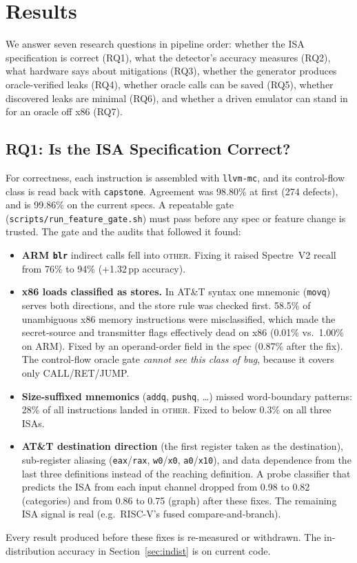 \documentclass[conference]{IEEEtran}
\begin{document}

\section{Results}
\label{sec:results}

We answer seven research questions in pipeline order: whether the ISA
specification is correct (RQ1), what the detector's accuracy measures (RQ2),
what hardware says about mitigations (RQ3), whether the generator produces
oracle-verified leaks (RQ4), whether oracle calls can be saved (RQ5), whether
discovered leaks are minimal (RQ6), and whether a driven emulator can stand in
for an oracle off x86 (RQ7).

\subsection{RQ1: Is the ISA Specification Correct?}
\label{sec:spec-bugs}
For correctness, each instruction is assembled with \texttt{llvm-mc}, and its
control-flow class is read back with \texttt{capstone}. Agreement was 98.80\%
at first (274 defects), and is 99.86\% on the current specs. A repeatable gate
(\texttt{scripts/run\_feature\_gate.sh}) must pass before any spec or feature
change is trusted. The gate and the audits that followed it found:
\begin{itemize}[itemsep=1pt,leftmargin=1.2em]
  \item \textbf{ARM \texttt{blr}} indirect calls fell into \textsc{other}.
    Fixing it raised Spectre~V2 recall from 76\% to 94\% (+1.32\,pp accuracy).
  \item \textbf{x86 loads classified as stores.} In AT\&T syntax one mnemonic
    (\texttt{movq}) serves both directions, and the store rule was checked
    first. 58.5\% of unambiguous x86 memory instructions were misclassified,
    which made the secret-source and transmitter flags effectively dead on x86
    (0.01\% vs.\ 1.00\% on ARM). Fixed by an operand-order field in the spec
    (0.87\% after the fix). The control-flow oracle gate \emph{cannot see this
    class of bug}, because it covers only CALL/RET/JUMP.
  \item \textbf{Size-suffixed mnemonics} (\texttt{addq}, \texttt{pushq},
    \ldots) missed word-boundary patterns: 28\% of all instructions landed in
    \textsc{other}. Fixed to below 0.3\% on all three ISAs.
  \item \textbf{AT\&T destination direction} (the first register taken as the
    destination), sub-register aliasing (\texttt{eax}/\texttt{rax},
    \texttt{w0}/\texttt{x0}, \texttt{a0}/\texttt{x10}), and data dependence
    from the last three definitions instead of the reaching definition.
    A probe classifier that predicts the ISA from each input channel dropped
    from 0.98 to 0.82 (categories) and from 0.86 to 0.75 (graph) after these
    fixes. The remaining ISA signal is real (e.g.\ RISC-V's fused
    compare-and-branch).
\end{itemize}
Every result produced before these fixes is re-measured or withdrawn. The
in-distribution accuracy in Section~\ref{sec:indist} is on current code.
\end{document}
